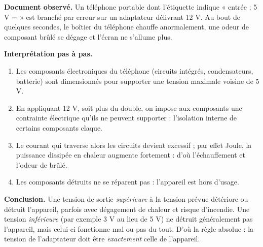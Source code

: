 \documentclass[11pt]{article}
\begin{document}
\begin{experience}
\textbf{Document observé.} Un téléphone portable dont l'étiquette indique « entrée : 5 V ⎓ » est branché par erreur sur un adaptateur délivrant 12 V. Au bout de quelques secondes, le boîtier du téléphone chauffe anormalement, une odeur de composant brûlé se dégage et l'écran ne s'allume plus.

\textbf{Interprétation pas à pas.}
\begin{enumerate}
\item Les composants électroniques du téléphone (circuits intégrés, condensateurs, batterie) sont dimensionnés pour supporter une tension maximale voisine de 5 V.
\item En appliquant 12 V, soit plus du double, on impose aux composants une contrainte électrique qu'ils ne peuvent supporter : l'isolation interne de certains composants claque.
\item Le courant qui traverse alors les circuits devient excessif ; par effet Joule, la puissance dissipée en chaleur augmente fortement : d'où l'échauffement et l'odeur de brûlé.
\item Les composants détruits ne se réparent pas : l'appareil est hors d'usage.
\end{enumerate}

\textbf{Conclusion.} Une tension de sortie \emph{supérieure} à la tension prévue détériore ou détruit l'appareil, parfois avec dégagement de chaleur et risque d'incendie. Une tension \emph{inférieure} (par exemple 3 V au lieu de 5 V) ne détruit généralement pas l'appareil, mais celui-ci fonctionne mal ou pas du tout. D'où la règle absolue : la tension de l'adaptateur doit être \emph{exactement} celle de l'appareil.
\end{experience}
\end{document}
